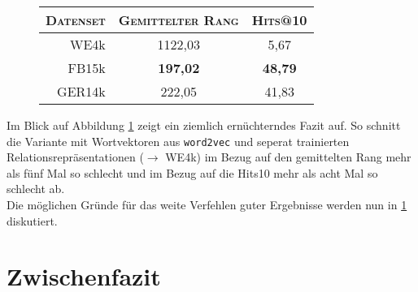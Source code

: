 \begin{figure}[h]
  \centering
  \begin{tabular}{r||c|c}
    \textsc{Datenset} & \textsc{Gemittelter Rang} & \textsc{Hits@10} \\
     \hline
     WE4k & 1122,03 & 5,67 \\
     FB15k & \textbf{197,02} & \textbf{48,79} \\
     GER14k & 222,05 & 41,83 \\
  \end{tabular}
  \caption[Resultate auf mit Wordvektoren auf WE3k]{\label{fig:eval-we4k}}
\end{figure}

Im Blick auf Abbildung \ref{fig:eval-we4k} zeigt ein ziemlich ernüchterndes Fazit auf. So schnitt die Variante
mit Wortvektoren aus \verb|word2vec| und seperat trainierten Relationsrepräsentationen ($\rightarrow$ WE4k) im Bezug auf
den gemittelten Rang mehr als fünf Mal so schlecht und im Bezug auf die Hits\@10 mehr als acht Mal so schlecht ab.\\
Die möglichen Gründe für das weite Verfehlen guter Ergebnisse werden nun in \ref{sec:we4k-zwifa} diskutiert.

\section{Zwischenfazit}\label{sec:we4k-zwifa}

